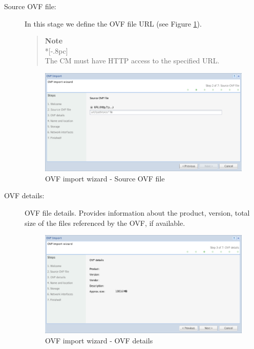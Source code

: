 \begin{description}
	\item[Source OVF file:] In this stage we define the OVF file URL (see Figure \ref{fig:ovf_import_file}).
		
        \begin{quote}
            {\large \bf Note} \\*[-.8pc]
            \underline{\hspace{6in}} \\
            The CM must have HTTP access to the specified URL.
        \end{quote}

        \begin{figure}[H]
            \begin{center}
            \includegraphics[scale=0.5]{screenshots/ovf_import_file.png}
            \caption{OVF import wizard - Source OVF file}
            \label{fig:ovf_import_file}
            \end{center}
        \end{figure}

	\item[OVF details:] OVF file details. Provides information about the product, version, total size of the files referenced by the OVF, if available.
		\begin{figure}[H]
            \begin{center}
            \includegraphics[scale=0.5]{screenshots/ovf_import_resume.png}
            \caption{OVF import wizard - OVF details}
            \label{fig:ovf_import_resume}
            \end{center}
        \end{figure}


\end{description}
